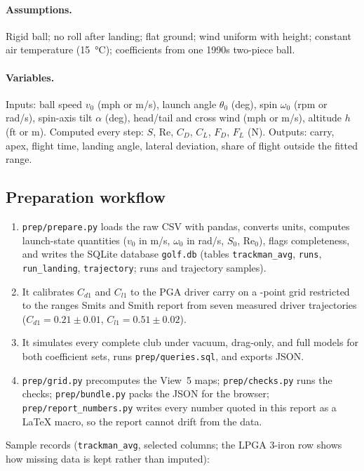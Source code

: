 \documentclass[11pt]{article}
\begin{document}
\paragraph{Assumptions.} Rigid ball; no roll after landing; flat ground; wind uniform with height;
constant air temperature (\SI{15}{\celsius}); coefficients from one 1990s two-piece ball.

\paragraph{Variables.} Inputs: ball speed $v_0$ (mph or m/s), launch angle $\theta_0$ (deg), spin
$\omega_0$ (rpm or rad/s), spin-axis tilt $\alpha$ (deg), head/tail and cross wind (mph or m/s),
altitude $h$ (ft or m). Computed every step: $S$, Re, $C_D$, $C_L$, $F_D$, $F_L$ (N). Outputs: carry,
apex, flight time, landing angle, lateral deviation, share of flight outside the fitted range.

\subsection{Preparation workflow}

\begin{enumerate}
\item \texttt{prep/prepare.py} loads the raw CSV with pandas, converts units, computes launch-state
quantities ($v_0$ in m/s, $\omega_0$ in rad/s, $S_0$, $\mathrm{Re}_0$), flags completeness, and
writes the SQLite database \texttt{golf.db} (tables \texttt{trackman\_avg}, \texttt{runs},
\texttt{run\_landing}, \texttt{trajectory}; \NRuns{} runs and \NTraj{} trajectory samples).
\item It calibrates $C_{d1}$ and $C_{l1}$ to the PGA driver carry on a \CalN-point grid restricted to
the ranges Smits and Smith report from seven measured driver trajectories ($C_{d1}=0.21\pm0.01$,
$C_{l1}=0.51\pm0.02$).
\item It simulates every complete club under vacuum, drag-only, and full models for both coefficient
sets, runs \texttt{prep/queries.sql}, and exports JSON.
\item \texttt{prep/grid.py} precomputes the View~5 maps; \texttt{prep/checks.py} runs the checks;
\texttt{prep/bundle.py} packs the JSON for the browser; \texttt{prep/report\_numbers.py} writes every
number quoted in this report as a \LaTeX{} macro, so the report cannot drift from the data.
\end{enumerate}

\noindent Sample records (\texttt{trackman\_avg}, selected columns; the LPGA 3-iron row shows how
missing data is kept rather than imputed):
\end{document}
